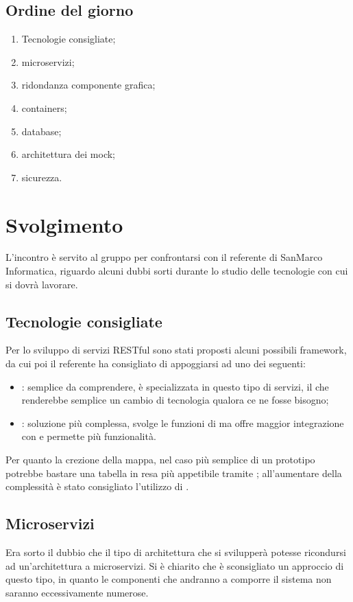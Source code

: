 \documentclass[]{article}
\begin{document}
		\subsection{Ordine del giorno}
		\begin{enumerate}
			\item Tecnologie consigliate;
			\item microservizi;
			\item ridondanza componente grafica;
			\item containers;
			\item database;
			\item architettura dei mock;
			\item sicurezza.
		\end{enumerate}
\newpage
	\section{Svolgimento}
	L'incontro è servito al gruppo per confrontarsi con il referente di SanMarco Informatica, riguardo alcuni dubbi sorti durante lo studio delle tecnologie con cui si dovrà lavorare.

		\subsection{Tecnologie consigliate}
		Per lo sviluppo di servizi RESTful sono stati proposti alcuni possibili framework, da cui poi il referente ha consigliato di appoggiarsi ad uno dei seguenti:
		\begin{itemize}
			\item \textbf{}: semplice da comprendere, è specializzata in questo tipo di servizi, il che renderebbe semplice un cambio di tecnologia qualora ce ne fosse bisogno;
			\item \textbf{}: soluzione più complessa, svolge le funzioni di  ma offre maggior integrazione con  e permette più funzionalità.
		\end{itemize}
		Per quanto la crezione della mappa, nel caso più semplice di un prototipo potrebbe bastare una tabella in  resa più appetibile tramite ; all'aumentare della complessità è stato consigliato l'utilizzo di .

		\subsection{Microservizi}
		Era sorto il dubbio che il tipo di architettura che si svilupperà potesse ricondursi ad un'architettura a microservizi. Si è chiarito che è sconsigliato un approccio di questo tipo, in quanto le componenti che andranno a comporre il sistema non saranno eccessivamente numerose.
\end{document}
